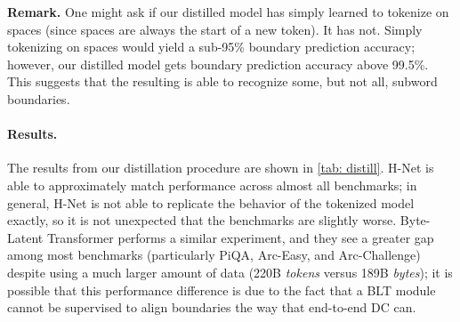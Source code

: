 \textbf{Remark.} One might ask if our distilled model has simply learned to tokenize on spaces (since spaces are always the start of a new token). It has not. Simply tokenizing on spaces would yield a sub-95\% boundary prediction accuracy; however, our distilled model gets boundary prediction accuracy above 99.5\%. This suggests that the resulting \model{} is able to recognize some, but not all, subword boundaries.


\paragraph{Results.} The results from our distillation procedure are shown in \cref{tab: distill}. 
H-Net is able to approximately match performance across almost all benchmarks; in general, H-Net is not able to replicate the behavior of the tokenized model exactly, so it is not unexpected that the benchmarks are slightly worse.
Byte-Latent Transformer \citep[Table 5]{BLT} performs a similar experiment, and they see a greater gap among most benchmarks (particularly PiQA, Arc-Easy, and Arc-Challenge) despite using a much larger amount of data (220B \emph{tokens} versus 189B \emph{bytes});
it is possible that this performance difference is due to the fact that a BLT module cannot be supervised to align boundaries the way that end-to-end DC can.


